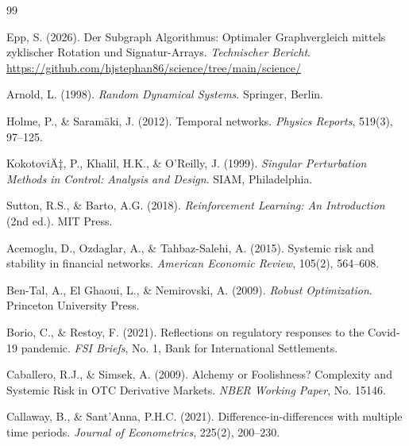 ﻿\documentclass[a4paper,12pt]{article}
\theoremstyle{definition}
\begin{document}

\begin{thebibliography}{99}

Epp, S. (2026).
\newblock Der Subgraph Algorithmus: Optimaler Graphvergleich mittels zyklischer
          Rotation und Signatur-Arrays.
\newblock \emph{Technischer Bericht}.
\newblock \url{https://github.com/hjstephan86/science/tree/main/science/}

Arnold, L. (1998).
\newblock \emph{Random Dynamical Systems}.
\newblock Springer, Berlin.

Holme, P., \& Saramäki, J. (2012).
\newblock Temporal networks.
\newblock \emph{Physics Reports}, 519(3), 97--125.

KokotoviÄ‡, P., Khalil, H.K., \& O'Reilly, J. (1999).
\newblock \emph{Singular Perturbation Methods in Control: Analysis and Design}.
\newblock SIAM, Philadelphia.

Sutton, R.S., \& Barto, A.G. (2018).
\newblock \emph{Reinforcement Learning: An Introduction} (2nd ed.).
\newblock MIT Press.

Acemoglu, D., Ozdaglar, A., \& Tahbaz-Salehi, A. (2015).
\newblock Systemic risk and stability in financial networks.
\newblock \emph{American Economic Review}, 105(2), 564--608.

Ben-Tal, A., El Ghaoui, L., \& Nemirovski, A. (2009).
\newblock \emph{Robust Optimization}.
\newblock Princeton University Press.

Borio, C., \& Restoy, F. (2021).
\newblock Reflections on regulatory responses to the Covid-19 pandemic.
\newblock \emph{FSI Briefs}, No. 1, Bank for International Settlements.

Caballero, R.J., \& Simsek, A. (2009).
\newblock Alchemy or Foolishness? Complexity and Systemic Risk in OTC Derivative Markets.
\newblock \emph{NBER Working Paper}, No. 15146.

Callaway, B., \& Sant'Anna, P.H.C. (2021).
\newblock Difference-in-differences with multiple time periods.
\newblock \emph{Journal of Econometrics}, 225(2), 200--230.


\end{thebibliography}
\end{document}

